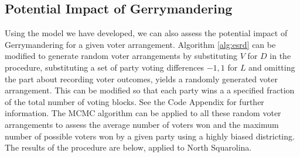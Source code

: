 \documentclass[12pt]{article}
\begin{document}
\subsection{Potential Impact of Gerrymandering}
Using the model we have developed, we can also assess the potential impact of Gerrymandering for a given voter arrangement. Algorithm \ref{alg:esrd} can be modified to generate random voter arrangements by substituting $V$ for $D$ in the procedure, substituting a set of party voting differences ${-1, 1}$ for $L$ and omitting the part about recording voter outcomes, yields a randomly generated voter arrangement. This can be modified so that each party wins a a specified fraction of the total number of voting blocks. See the Code Appendix for further information. The MCMC algorithm can be applied to all these random voter arrangements to assess the average number of voters won and the maximum number of possible voters won by a given party using a highly biased districting. The results of the procedure are below, applied to North Squarolina.
\end{document}
